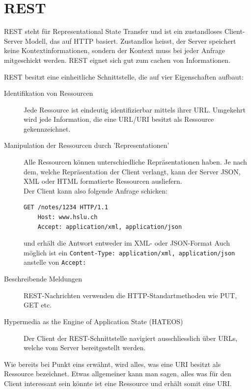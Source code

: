 \documentclass[a4paper, 11pt]{article}
\newcommand{\code}[1]{\texttt{#1}}
\begin{document}
\section{REST}
REST steht für Representational State Transfer und ist ein zustandloses Client-Server Modell, das auf HTTP basiert. Zustandlos heisst, der Server speichert keine Kontextinformationen, sondern der Kontext muss bei jeder Anfrage mitgeschickt werden. REST eignet sich gut zum cachen von Informationen.
\vspace{10px}

\noindent REST besitzt eine einheitliche Schnittstelle, die auf vier Eigenschaften aufbaut:

\begin{description}
	\item[Identifikation von Ressourcen ] Jede Ressource ist eindeutig identifizierbar mittels ihrer URL. Umgekehrt wird jede Information, die eine URL/URI besitzt als Ressource gekennzeichnet.
	\item[Manipulation der Ressourcen durch 'Representationen' ] Alle Ressourcen können unterschiedliche Repräsentationen haben. Je nach dem, welche Repräsentation der Client verlangt, kann der Server JSON, XML oder HTML formatierte Ressourcen ausliefern. \\
	Der Client kann also folgende Anfrage schicken:
	\begin{lstlisting}[language=html]
	GET /notes/1234 HTTP/1.1 
	Host: www.hslu.ch
	Accept: application/xml, application/json
	\end{lstlisting}
	und erhält die Antwort entweder im XML- oder JSON-Format
	Auch möglich ist ein \code{Content-Type: application/xml, application/json} anstelle von \code{Accept: } 
	\item[Beschreibende Meldungen ] REST-Nachrichten verwenden die HTTP-Standartmethoden wie PUT, GET etc. 
	\item[Hypermedia as the Engine of Application State (HATEOS)] Der Client der REST-Schnittstelle navigiert ausschliesslich über URLs, welche vom Server bereitgestellt werden.
\end{description}
\vspace{10px}

\noindent Wie bereits bei Punkt eins erwähnt, wird alles, was eine URI besitzt als Ressource bezeichnet. Etwas allgemeiner kann man sagen, alles was für den Client interessant sein könnte ist eine Ressource und erhält somit eine URI.
\vspace{10px}
\end{document}
